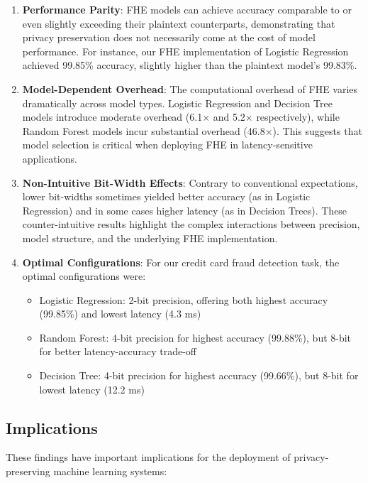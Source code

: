 \documentclass[a4paper,12pt]{article}
\begin{document}
\begin{enumerate}
    \item \textbf{Performance Parity}: FHE models can achieve accuracy comparable to or even slightly exceeding their plaintext counterparts, demonstrating that privacy preservation does not necessarily come at the cost of model performance. For instance, our FHE implementation of Logistic Regression achieved 99.85\% accuracy, slightly higher than the plaintext model's 99.83\%.
    
    \item \textbf{Model-Dependent Overhead}: The computational overhead of FHE varies dramatically across model types. Logistic Regression and Decision Tree models introduce moderate overhead (6.1× and 5.2× respectively), while Random Forest models incur substantial overhead (46.8×). This suggests that model selection is critical when deploying FHE in latency-sensitive applications.
    
    \item \textbf{Non-Intuitive Bit-Width Effects}: Contrary to conventional expectations, lower bit-widths sometimes yielded better accuracy (as in Logistic Regression) and in some cases higher latency (as in Decision Trees). These counter-intuitive results highlight the complex interactions between precision, model structure, and the underlying FHE implementation.
    
    \item \textbf{Optimal Configurations}: For our credit card fraud detection task, the optimal configurations were:
    \begin{itemize}
        \item Logistic Regression: 2-bit precision, offering both highest accuracy (99.85\%) and lowest latency (4.3 ms)
        \item Random Forest: 4-bit precision for highest accuracy (99.88\%), but 8-bit for better latency-accuracy trade-off
        \item Decision Tree: 4-bit precision for highest accuracy (99.66\%), but 8-bit for lowest latency (12.2 ms)
    \end{itemize}
\end{enumerate}

\subsection{Implications}

These findings have important implications for the deployment of privacy-preserving machine learning systems:
\end{document}
